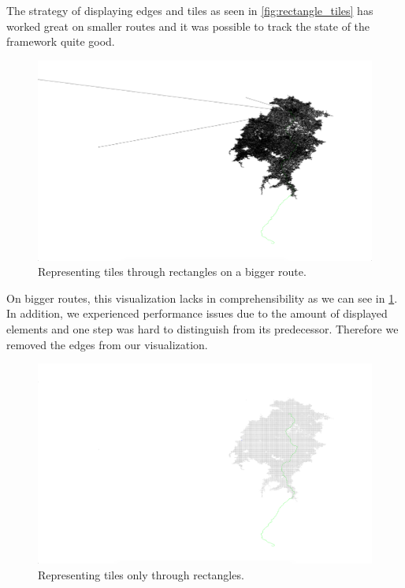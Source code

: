 \documentclass
[
    paper = a4,
    pagesize,
    12 pt,
    oneside,                       %
    open = right,
    DIV = calc,
    BCOR = 0 mm,                   %
    bibtotoc
]
{scrbook}
\begin{document}
The strategy of displaying edges and tiles as seen in  \cref{fig:rectangle_tiles} has worked great on smaller routes and it was possible to track the state of the framework quite good.

\begin{figure}[H]
    \includegraphics[width=\textwidth]{Images/vis-rectangular-tiles.png}
\caption[]{Representing tiles through rectangles on a bigger route.}
\label{fig:rectangle_tiles_big}
\end{figure}

On bigger routes, this visualization lacks in comprehensibility as we can see in \cref{fig:rectangle_tiles_big}.
In addition, we experienced performance issues due to the amount of displayed elements and one step was hard to distinguish from its predecessor.
Therefore we removed the edges from our visualization.

\begin{figure}[H]
        \includegraphics[width=\textwidth]{Images/vis-current-tile.png}
\caption[]{Representing tiles only through rectangles.}
\label{fig:only_rectangles}
\end{figure}
\end{document}
